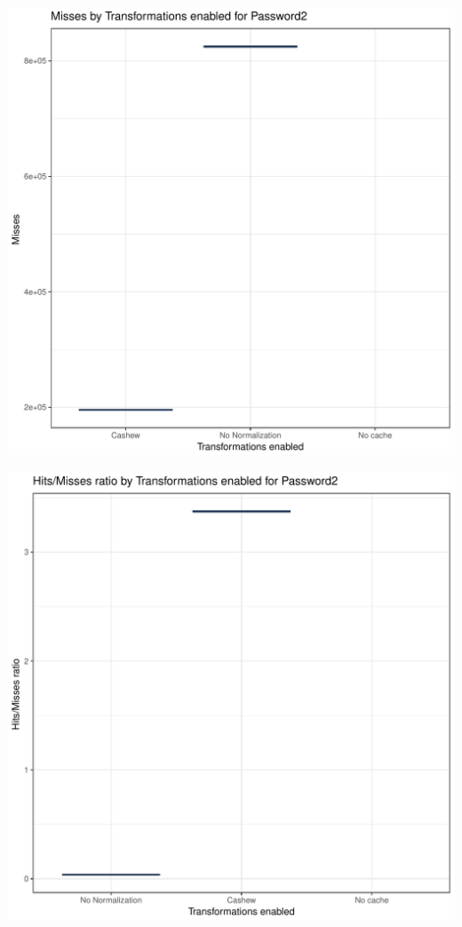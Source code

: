 \documentclass{article}\usepackage[]{graphicx}\usepackage[]{color}
\makeatletter
\def\maxwidth{ %
  \ifdim\Gin@nat@width>\linewidth
    \linewidth
  \else
    \Gin@nat@width
  \fi
}
\newenvironment{knitrout}{}{} %
\makeatother
\begin{document}
\begin{knitrout}
\includegraphics[width=\maxwidth]{figure/password2-3} 

\includegraphics[width=\maxwidth]{figure/password2-4} 

\end{knitrout}
\end{document}
